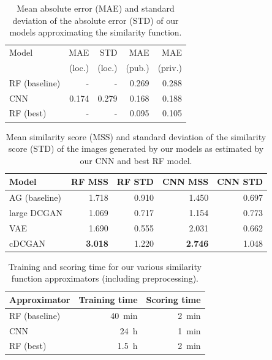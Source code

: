 \documentclass[10pt,conference,compsocconf]{IEEEtran}
\begin{document}
\begin{table}\centering
    \begin{tabular}{lrr|rr}
    \toprule
        Model           & MAE           & STD           &  MAE          &  MAE \\
                        & (loc.)        & (loc.)        & (pub.)        & (priv.) \\
    \midrule
        RF (baseline)   & -             & -             & \SI{0.269}{}  & \SI{0.288}{} \\
        CNN             & \SI{0.174}{}  & \SI{0.279}{}  & \SI{0.168}{}  & \SI{0.188}{} \\
        RF (best)       & -             & -             & \SI{0.095}{}  & \SI{0.105}{} \\
    \bottomrule
    \end{tabular}
\caption{Mean absolute error (MAE) and standard deviation of the absolute error (STD) of our models approximating the similarity function.}
\label{tab:SFA_MSS}
\end{table}

\begin{table}\centering
    \begin{tabular}{lrr|rr}
    \toprule
        Model           & RF MSS                & RF STD        & CNN MSS               & CNN STD \\
    \midrule
        AG (baseline)   & \SI{1.718}{}          & \SI{0.910}{}  & \SI{1.450}{}          & \SI{0.697}{} \\
        large DCGAN     & \SI{1.069}{}          & \SI{0.717}{}  & \SI{1.154}{}          & \SI{0.773}{} \\
        VAE             & \SI{1.690}{}          & \SI{0.555}{}  & \SI{2.031}{}          & \SI{0.662}{} \\
        cDCGAN          & \textbf{\SI{3.018}{}} & \SI{1.220}{}  & \textbf{\SI{2.746}{}} & \SI{1.048}{} \\
    \bottomrule
    \end{tabular}
\caption{Mean similarity score (MSS) and standard deviation of the similarity score (STD) of the images generated by our models as estimated by our CNN and best RF model.}
\label{tab:gen_MSS}
\end{table}

\begin{table}\centering
    \begin{tabular}{lrr}
    \toprule
        Approximator    & Training time     & Scoring time \\
    \midrule
        RF (baseline)   & \SI{40}{\minute}  & \SI{2}{\minute} \\
        CNN             & \SI{24}{\hour}    & \SI{1}{\minute} \\
        RF (best)       & \SI{1.5}{\hour}   & \SI{2}{\minute} \\
    \bottomrule
    \end{tabular}
\caption{Training and scoring time for our various similarity function approximators (including preprocessing).}\label{tab:SFA_time}
\end{table}
\end{document}
